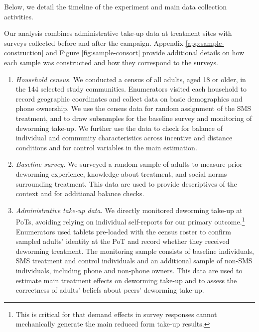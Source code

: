 \documentclass[12pt,a4paper]{article}
\begin{document}
Below, we detail the timeline of the experiment and main data collection activities. 

\begin{figure}[H]

\label{fig:timeline}
\end{figure}

Our analysis combines administrative take-up data at treatment sites with surveys collected before and after the campaign. Appendix \ref{app:sample-construction} and Figure \ref{fig:sample-consort} provide additional details on how each sample was constructed and how they correspond to the surveys.




\begin{enumerate} 
\item \emph{Household census.}
We conducted a census of all adults, aged 18 or older, in the 144 selected study communities. Enumerators visited each household to record geographic coordinates and collect data on basic demographics and phone ownership. We use the census data for random assignment of the SMS treatment, and to draw subsamples for the baseline survey and monitoring of deworming take-up. We further use the data to check for balance of individual and community characteristics across incentive and distance conditions and for control variables in the main estimation. 

\item \emph{Baseline survey.} We surveyed a random sample of adults to measure prior deworming experience, knowledge about treatment, and social norms surrounding treatment. This data are used to provide descriptives of the context and for additional balance checks. 

\item \emph{Administrative take-up data.} We directly monitored deworming take-up at PoTs, avoiding relying on individual self-reports for our primary outcome.\footnote{This is critical for that demand effects in survey responses cannot mechanically generate the main reduced form take-up results.} Enumerators used tablets pre-loaded with the census roster to confirm sampled adults' identity at the PoT and record whether they received deworming treatment. The monitoring sample consists of baseline individuals, SMS treatment and control individuals and an additional sample of non-SMS individuals, including phone and non-phone owners. This data are used to estimate main treatment effects on deworming take-up and to assess the correctness of adults' beliefs about peers' deworming take-up.


\end{enumerate}
\end{document}
